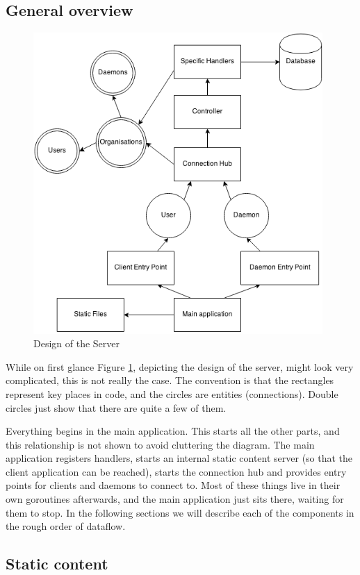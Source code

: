 \documentclass{l3proj}
\begin{document}
\subsection{General overview}

\begin{figure}[H]
\centering
\includegraphics[width=110mm]{images/ServerDesign.png}
\caption{Design of the Server}
\label{fig:ServerDesign}
\end{figure}

While on first glance Figure \ref{fig:ServerDesign}, depicting the design of the server, might look very complicated, this is not really the case. The convention is that the rectangles represent key places in code, and the circles are entities (connections). Double circles just show that there are quite a few of them. 

Everything begins in the main application. This starts all the other parts, and this relationship is not shown to avoid cluttering the diagram. The main application registers handlers, starts an internal static content server (so that the client application can be reached), starts the connection hub and provides entry points for clients and daemons to connect to. Most of these things live in their own goroutines afterwards, and the main application just sits there, waiting for them to stop. In the following sections we will describe each of the components in the rough order of dataflow.

\subsection{Static content}
\end{document}
